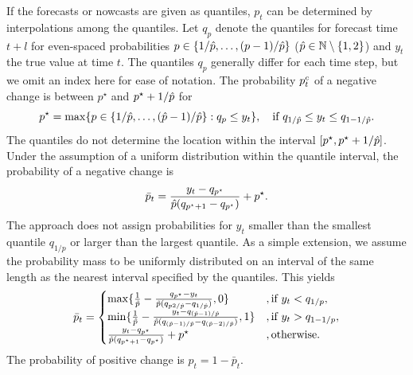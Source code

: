 If the forecasts or nowcasts are given as quantiles, $p_t$ can be determined by interpolations among the quantiles.
Let $q_p$ denote the quantiles for forecast time $t+l$ for even-spaced probabilities $p \in \{1/\hat{p}, \dots, (p-1) / \hat{p}\}$ ($\hat{p} \in \mathbb{N} \setminus \{1, 2\}$) and $y_t$ the true value at time $t$.
The quantiles $q_p$ generally differ for each time step, but we omit an index here for ease of notation.
The probability $p^c_t$ of a negative change is between $p^{\star}$ and $p^{\star} + 1/\hat{p}$ for
\begin{equation*}
    p^{\star} = \max \{p \in \{1/\hat{p}, \dots, (\hat{p}-1) / \hat{p}\}: q_p \leq y_t\} , \quad \text{if}\ q_{1/\hat{p}} \leq y_t \leq q_{1 - 1/\hat{p}}.
\end{equation*}
The quantiles do not determine the location within the interval $[p^{\star}, p^{\star} + 1/\hat{p}]$.
Under the assumption of a uniform distribution within the quantile interval, the probability of a negative change is
\begin{equation*}
    \bar{p}_t = \frac{y_t - q_{p^\star}}{\hat{p} (q_{p^{\star} + 1} - q_{p^{\star}})} + p^{\star}.
\end{equation*}
The approach does not assign probabilities for $y_t$ smaller than the smallest quantile $q_{1/p}$ or larger than the largest quantile.
As a simple extension, we assume the probability mass to be uniformly distributed on an interval of the same length as the nearest interval specified by the quantiles.
This yields
\begin{equation*}
\bar{p}_t = \begin{cases}
    \max \{\frac{1}{\hat{p}} - \frac{q_{p^\star} - y_t}{\hat{p} (q_{p2/\hat{p}} - q_{1/\hat{p}})}, 0\} &, \text{if } y_t < q_{1/p}, \\
    \min \{\frac{1}{\hat{p}} - \frac{y_t - q_{(\hat{p}-1)/\hat{p}}}{\hat{p} (q_{(\hat{p}-1)/\hat{p}} - q_{(\hat{p}-2)/\hat{p}})}, 1\} &, \text{if } y_t > q_{1 - 1/p}, \\
    \frac{y_t - q_{p^\star}}{\hat{p} (q_{p^{\star} + 1} - q_{p^{\star}})} + p^{\star} &, \text{otherwise.}
\end{cases}
\end{equation*}
The probability of positive change is $p_t = 1 - \bar{p}_t$.

